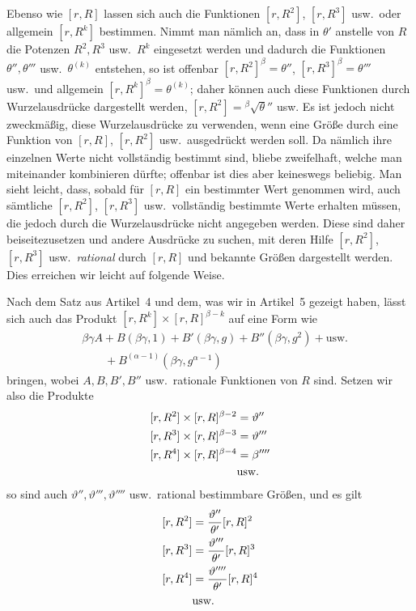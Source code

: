 Ebenso wie $[r,R]$ lassen sich auch die Funktionen $[r,R^2]$, $[r,R^3]$ usw.\ oder allgemein $[r,R^k]$ bestimmen. Nimmt man nämlich an, dass in $\theta'$ anstelle von $R$ die Potenzen $R^2,R^3$ usw.\ $R^k$ eingesetzt werden und dadurch die Funktionen $\theta'',\theta'''$ usw.\ $\theta^{(k)}$ entstehen, so ist offenbar $[r,R^2]^\beta=\theta''$, $[r,R^3]^\beta=\theta'''$ usw.\ und allgemein $[r,R^k]^\beta=\theta^{(k)}$; daher können auch diese Funktionen durch Wurzelausdrücke dargestellt werden, $[r,R^2]={}^{\beta}\!\surd\theta''$ usw. Es ist jedoch nicht zweckmäßig, diese Wurzelausdrücke zu verwenden, wenn eine Größe durch eine Funktion von $[r,R]$, $[r,R^2]$ usw.\ ausgedrückt werden soll. Da nämlich ihre einzelnen Werte nicht vollständig bestimmt sind, bliebe zweifelhaft, welche man miteinander kombinieren dürfte; offenbar ist dies aber keineswegs beliebig. Man sieht leicht, dass, sobald für $[r,R]$ ein bestimmter Wert genommen wird, auch sämtliche $[r,R^2]$, $[r,R^3]$ usw.\ vollständig bestimmte Werte erhalten müssen, die jedoch durch die Wurzelausdrücke nicht angegeben werden. Diese sind daher beiseitezusetzen und andere Ausdrücke zu suchen, mit deren Hilfe $[r,R^2]$, $[r,R^3]$ usw.\ \emph{rational} durch $[r,R]$ und bekannte Größen dargestellt werden. Dies erreichen wir leicht auf folgende Weise.

Nach dem Satz aus Artikel~4 und dem, was wir in Artikel~5 gezeigt haben, lässt sich auch das Produkt $[r,R^k]\times[r,R]^{\beta-k}$ auf eine Form wie
\[
\begin{aligned}
&\beta\gamma A+B(\beta\gamma,1)+B'(\beta\gamma,g)+B''(\beta\gamma,g^2)+\text{usw.}\\
&\qquad{}+B^{(\alpha-1)}(\beta\gamma,g^{\alpha-1})
\end{aligned}
\]
bringen, wobei $A,B,B',B''$ usw.\ rationale Funktionen von $R$ sind. Setzen wir also die Produkte
\[
\begin{aligned}
\relax[r,R^2]\times[r,R]^{\beta-2}&=\vartheta''\\
\relax[r,R^3]\times[r,R]^{\beta-3}&=\vartheta'''\\
\relax[r,R^4]\times[r,R]^{\beta-4}&=\beta''''\\
&\text{usw.}
\end{aligned}
\]
so sind auch $\vartheta'',\vartheta''',\vartheta''''$ usw.\ rational bestimmbare Größen, und es gilt
\[
\begin{aligned}
\relax[r,R^2]&=\frac{\vartheta''}{\theta'}[r,R]^2\\
\relax[r,R^3]&=\frac{\vartheta'''}{\theta'}[r,R]^3\\
\relax[r,R^4]&=\frac{\vartheta''''}{\theta'}[r,R]^4\\
&\text{usw.}
\end{aligned}
\]

